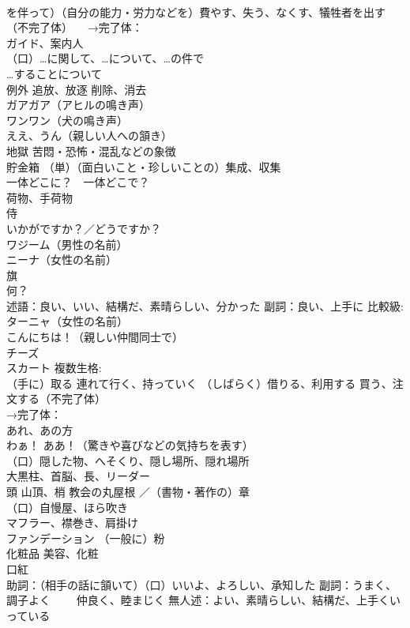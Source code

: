 \documentclass[8pt]{extreport}
\begin{document}
\begin{CJK}{UTF8}{min}
\\	を伴って）（自分の能力・労力などを）費やす、失う、なくす、犠牲者を出す（不完了体） 　→完了体：
\\	ガイド、案内人
\\	（口）…に関して、…について、…の件で 
\\	…することについて
\\	例外 追放、放逐 削除、消去
\\	ガアガア（アヒルの鳴き声）
\\	ワンワン（犬の鳴き声）
\\	ええ、うん（親しい人への頷き）
\\	地獄 苦悶・恐怖・混乱などの象徴
\\	貯金箱 （単）（面白いこと・珍しいことの）集成、収集
\\	一体どこに？　一体どこで？
\\	荷物、手荷物
\\	侍
\\	いかがですか？／どうですか？
\\	ワジーム（男性の名前）
\\	ニーナ（女性の名前）
\\	旗
\\	何？
\\	述語：良い、いい、結構だ、素晴らしい、分かった 副詞：良い、上手に 比較級:
\\	ターニャ（女性の名前）
\\	こんにちは！（親しい仲間同士で）
\\	チーズ
\\	スカート 複数生格:
\\	（手に）取る 連れて行く、持っていく （しばらく）借りる、利用する 買う、注文する（不完了体） 
\\	→完了体：
\\	あれ、あの方
\\	わぁ！ ああ！（驚きや喜びなどの気持ちを表す）
\\	（口）隠した物、へそくり、隠し場所、隠れ場所
\\	大黒柱、首脳、長、リーダー 
\\	頭 山頂、梢 教会の丸屋根 ／（書物・著作の）章
\\	（口）自慢屋、ほら吹き
\\	マフラー、襟巻き、肩掛け
\\	ファンデーション （一般に）粉
\\	[集合]化粧品 美容、化粧
\\	口紅
\\	助詞：（相手の話に頷いて）（口）いいよ、よろしい、承知した 副詞：うまく、調子よく 　　仲良く、睦まじく 無人述：よい、素晴らしい、結構だ、上手くいっている

\end{CJK}
\end{document}
